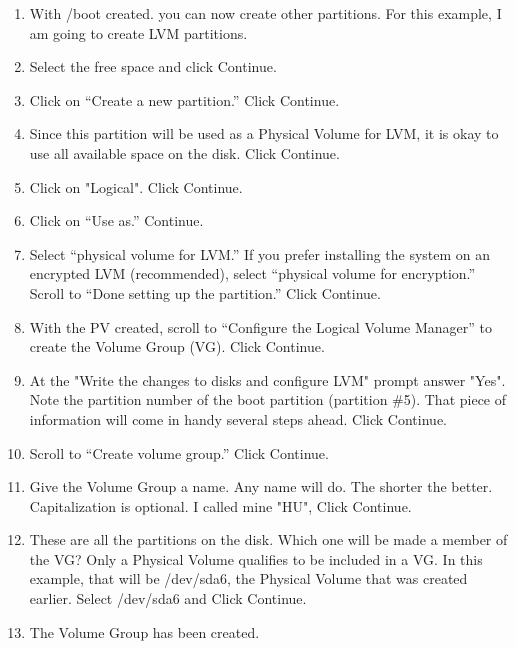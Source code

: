 \documentclass[12pt,notitlepage,onecolumn,oneside,openany]{memoir}
\begin{document}
\begin{enumerate}
\item \textsf{With /boot created. you can now create other partitions. For this example, I am going to create LVM partitions.}
 
\item \textsf{Select the free space and click Continue.}
 
\item \textsf{Click on “Create a new partition.” Click Continue.} 

\item \textsf{Since this partition will be used as a Physical Volume for LVM, it is okay to use all available space on the disk. Click Continue.}
 
\item \textsf{Click on "Logical". Click Continue.}
 
\item \textsf{Click on “Use as.” Continue.} 

\item \textsf{Select “physical volume for LVM.” If you prefer installing the system on an encrypted LVM (recommended), select “physical volume for encryption.” Scroll to “Done setting up the partition.” Click Continue.} 

\item \textsf{With the PV created, scroll to “Configure the Logical Volume Manager” to create the Volume Group (VG). Click Continue.}
 
\item \textsf{At the "Write the changes to disks and configure LVM" prompt answer "Yes". Note the partition number of the boot partition (partition \#5). That piece of information will come in handy several steps ahead. Click Continue.} 

\item \textsf{Scroll to “Create volume group.” Click Continue.} 

\item \textsf{Give the Volume Group a name. Any name will do. The shorter the better. Capitalization is optional.  I called mine "HU", Click Continue.}
 
\item \textsf{These are all the partitions on the disk. Which one will be made a member of the VG? Only a Physical Volume qualifies to be included in a VG. In this example, that will be /dev/sda6, the Physical Volume that was created earlier. Select /dev/sda6 and Click Continue.}
 
\item \textsf{The Volume Group has been created.} 


\end{enumerate}
\end{document}
